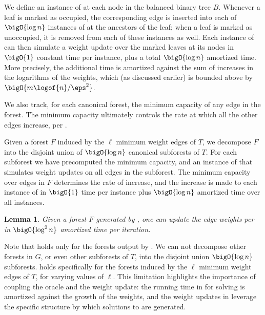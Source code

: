 \documentclass[11pt]{article}
\numberwithin{equation}{section}
\newtheorem{lemma}[theorem]{Lemma}
\theoremstyle{definition}
\theoremstyle{plain}
\begin{document}
We define an instance of  at each node in the
balanced binary tree $B$. Whenever a leaf is marked as occupied, the
corresponding edge is inserted into each of $\bigO{\log n}$ instances
of  at the ancestors of the leaf; when a leaf is
marked as unoccupied, it is removed from each of these instances as
well. Each instance of  can then simulate a
weight update over the marked leaves at its nodes in $\bigO{1}$
constant time per instance, plus a total $\bigO{\log n}$ amortized
time. More precisely, the additional time is amortized against the sum
of increases in the logarithms of the weights, which (as discussed
earlier) is bounded above by $\bigO{m \logof{n} / \eps^2}$.

We also track, for each canonical forest, the minimum capacity of any
edge in the forest. The minimum capacity ultimately controls the rate
at which all the other edges increase, per
.

Given a forest $F$ induced by the $\ell$ minimum weight edges of $T$,
we decompose $F$ into the disjoint union of $\bigO{\log n}$ canonical
subforests of $T$. For each subforest we have precomputed the minimum
capacity, and an instance of  that simulates
weight updates on all edges in the subforest. The minimum capacity
over edges in $F$ determines the rate of increase, and the increase is
made to each instance of  in $\bigO{1}$ time per
instance plus $\bigO{\log n}$ amortized time over all instances.

\begin{lemma}
   Given a forest $F$ generated by
  , one can update the edge weights per
   in $\bigO{\log^2 n}$
  amortized time per iteration.
\end{lemma}


Note that  holds only for the forests
output by . We can not decompose other
forests in $G$, or even other subforests of $T$, into the disjoint
union $\bigO{\log n}$ subforests. 
holds specifically for the forests induced by the $\ell$ minimum
weight edges of $T$, for varying values of $\ell$. This limitation
highlights the importance of coupling the oracle and the weight
update: the running time in  for solving
 is amortized against the growth of the
weights, and the weight updates in 
leverage the specific structure by which solutions to
 are generated.
\end{document}
